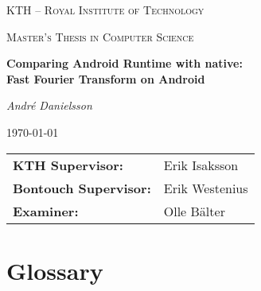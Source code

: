 \documentclass[a4paper, 12pt, notitlepage]{report}
\def\thesistitle{\LARGE Comparing Android Runtime with native:\\ Fast Fourier Transform on Android}
\def\theauthor{André Danielsson}
\def\theschool{KTH -- Royal Institute of Technology}
\def\thedegree{Master's Thesis in Computer Science}
\def\thesupervisors{%
    \begin{tabular}{ll}
        \textbf{KTH Supervisor:} & Erik Isaksson\\
        \textbf{Bontouch Supervisor:} & Erik Westenius\\
        \textbf{Examiner:} & Olle Bälter
    \end{tabular}
}
\begin{document}

\begin{titlepage}
    \centering
    {\scshape\large\theschool\par}
    \vspace{1cm}
    {\scshape\normalsize\thedegree\par}
    \vspace{1.5cm}
    {\Large\bfseries\thesistitle\par}
    \vspace{1.5cm}
    {\large\itshape\theauthor\par}
    \vspace{1cm}
    {\large \today\par}

    \vfill

    {\large\thesupervisors\par}
    \vspace{1cm}
\end{titlepage}

\thispagestyle{empty}
\begin{abstract}
    
\end{abstract}

\vspace{1cm}

\renewcommand{\abstractname}{Sammanfattning}
\begin{abstract}
    
\end{abstract}

\newpage
\thispagestyle{empty}
\section*{Glossary}


\tableofcontents
\thispagestyle{empty}
\end{document}
